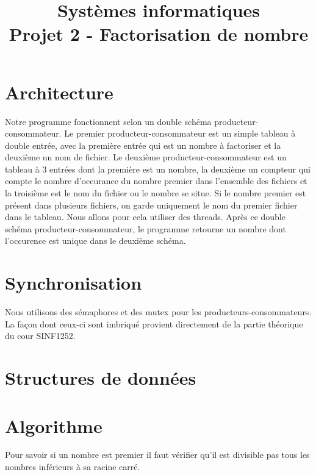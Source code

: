 \documentclass[11pt,a4paper]{article}
\title{Systèmes informatiques\\
Projet 2 - Factorisation de nombre}
\date{\vspace{-5ex}}
\begin{document}
\maketitle


\section{Architecture}
Notre programme fonctionnent selon un double schéma producteur-consommateur. Le premier producteur-consommateur est un simple tableau à double entrée, avec la première entrée qui est un nombre à factoriser et la deuxième un nom de fichier. Le deuxième producteur-consommateur est un tableau à 3 entrées dont la première est un nombre, la deuxième un compteur qui compte le nombre d'occurance du nombre premier dans l'ensemble des fichiers et la troisième est le nom du fichier ou le nombre se situe. Si le nombre premier est présent dans plusieurs fichiers, on garde uniquement le nom du premier fichier dans le tableau. Nous allons pour cela utiliser des threads. Après ce double schéma producteur-consommateur, le programme retourne un nombre dont l'occurence est unique dans le deuxième schéma.

\section{Synchronisation}
Nous utilisons des sémaphores et des mutex pour les producteurs-consommateurs. La façon dont ceux-ci sont imbriqué provient directement de la partie théorique du cour SINF1252.

\section{Structures de données}


\section{Algorithme}

Pour savoir si un nombre est premier il faut vérifier qu'il est divisible pas tous les nombres inférieurs à sa racine carré. 
\end{document}
